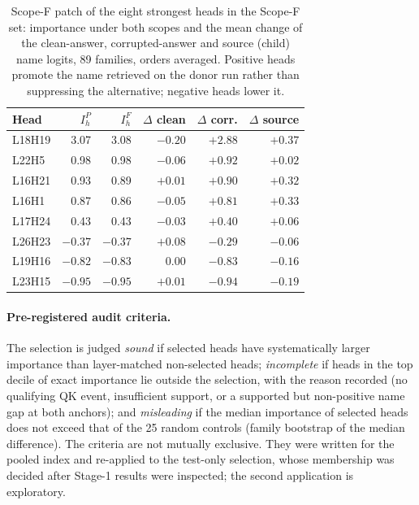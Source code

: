 \begin{table}[h]
\centering\scriptsize
\setlength{\tabcolsep}{3pt}
\begin{tabular}{@{}lrrrrr@{}}
\toprule
Head & $I^P_h$ & $I^F_h$ & $\Delta$ clean & $\Delta$ corr. & $\Delta$ source \\
\midrule
L18H19 & 3.07 & 3.08 & $-0.20$ & $+2.88$ & $+0.37$ \\
L22H5  & 0.98 & 0.98 & $-0.06$ & $+0.92$ & $+0.02$ \\
L16H21 & 0.93 & 0.89 & $+0.01$ & $+0.90$ & $+0.32$ \\
L16H1  & 0.87 & 0.86 & $-0.05$ & $+0.81$ & $+0.33$ \\
L17H24 & 0.43 & 0.43 & $-0.03$ & $+0.40$ & $+0.06$ \\
L26H23 & $-0.37$ & $-0.37$ & $+0.08$ & $-0.29$ & $-0.06$ \\
L19H16 & $-0.82$ & $-0.83$ & $0.00$ & $-0.83$ & $-0.16$ \\
L23H15 & $-0.95$ & $-0.95$ & $+0.01$ & $-0.94$ & $-0.19$ \\
\bottomrule
\end{tabular}
\caption{Scope-F patch of the eight strongest heads in the Scope-F set: importance
under both scopes and the mean change of the clean-answer, corrupted-answer and
source (child) name logits, 89 families, orders averaged. Positive heads promote the
name retrieved on the donor run rather than suppressing the alternative; negative
heads lower it.}
\label{tab:scopeF-app}
\end{table}

\paragraph{Pre-registered audit criteria.}
The selection is judged \emph{sound} if selected heads have systematically larger
importance than layer-matched non-selected heads; \emph{incomplete} if heads in the
top decile of exact importance lie outside the selection, with the reason recorded
(no qualifying QK event, insufficient support, or a supported but non-positive name
gap at both anchors); and \emph{misleading} if the median importance of selected
heads does not exceed that of the 25 random controls (family bootstrap of the median
difference). The criteria are not mutually exclusive. They were written for the
pooled index and re-applied to the test-only selection, whose membership was
decided after Stage-1 results were inspected; the second application is
exploratory.

